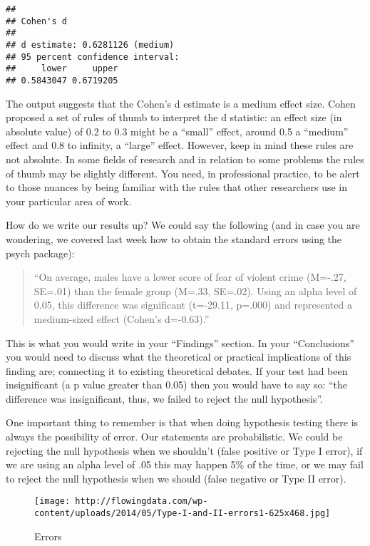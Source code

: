 \documentclass[
]{book}
\begin{document}
\begin{verbatim}
## 
## Cohen's d
## 
## d estimate: 0.6281126 (medium)
## 95 percent confidence interval:
##     lower     upper 
## 0.5843047 0.6719205
\end{verbatim}

The output suggests that the Cohen's d estimate is a medium effect size. Cohen proposed a set of rules of thumb to interpret the d statistic: an effect size (in absolute value) of 0.2 to 0.3 might be a ``small'' effect, around 0.5 a ``medium'' effect and 0.8 to infinity, a ``large'' effect. However, keep in mind these rules are not absolute. In some fields of research and in relation to some problems the rules of thumb may be slightly different. You need, in professional practice, to be alert to those nuances by being familiar with the rules that other researchers use in your particular area of work.

How do we write our results up? We could say the following (and in case you are wondering, we covered last week how to obtain the standard errors using the psych package):

\begin{quote}
``On average, males have a lower score of fear of violent crime (M=-.27, SE=.01) than the female group (M=.33, SE=.02). Using an alpha level of 0.05, this difference was significant (t=-29.11, p=.000) and represented a medium-sized effect (Cohen's d=-0.63).''
\end{quote}

This is what you would write in your ``Findings'' section. In your ``Conclusions'' you would need to discuss what the theoretical or practical implications of this finding are; connecting it to existing theoretical debates. If your test had been insignificant (a p value greater than 0.05) then you would have to say so: ``the difference was insignificant, thus, we failed to reject the null hypothesis''.

One important thing to remember is that when doing hypothesis testing there is always the possibility of error. Our statements are probabilistic. We could be rejecting the null hypothesis when we shouldn't (false positive or Type I error), if we are using an alpha level of .05 this may happen 5\% of the time, or we may fail to reject the null hypothesis when we should (false negative or Type II error).

\begin{figure}
\centering
\texttt{[image: http://flowingdata.com/wp-content/uploads/2014/05/Type-I-and-II-errors1-625x468.jpg]}
\caption{Errors}
\end{figure}
\end{document}
